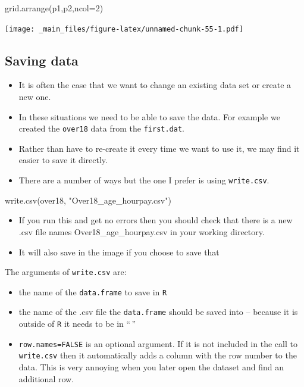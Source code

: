 \documentclass[
]{gitbook}
\newenvironment{Shaded}{\begin{snugshade}}{\end{snugshade}}
\newcommand{\AttributeTok}[1]{\textcolor[rgb]{0.77,0.63,0.00}{#1}}
\newcommand{\DecValTok}[1]{\textcolor[rgb]{0.00,0.00,0.81}{#1}}
\newcommand{\FunctionTok}[1]{\textcolor[rgb]{0.00,0.00,0.00}{#1}}
\newcommand{\NormalTok}[1]{#1}
\newcommand{\StringTok}[1]{\textcolor[rgb]{0.31,0.60,0.02}{#1}}
\providecommand{\tightlist}{%
  \setlength{\itemsep}{0pt}\setlength{\parskip}{0pt}}
\begin{document}
\begin{Shaded}
\begin{Highlighting}[]
\FunctionTok{grid.arrange}\NormalTok{(p1,p2,}\AttributeTok{ncol=}\DecValTok{2}\NormalTok{)}
\end{Highlighting}
\end{Shaded}

\texttt{[image: \_main\_files/figure-latex/unnamed-chunk-55-1.pdf]}

\hypertarget{saving-data}{%
\subsection{Saving data}\label{saving-data}}

\begin{itemize}
\tightlist
\item
  It is often the case that we want to change an existing data set or create a new one.
\item
  In these situations we need to be able to save the data. For example we created the \texttt{over18} data from the \texttt{first.dat}.
\item
  Rather than have to re-create it every time we want to use it, we may find it easier to save it directly.
\item
  There are a number of ways but the one I prefer is using \texttt{write.csv}.
\end{itemize}

\begin{Shaded}
\begin{Highlighting}[]
\FunctionTok{write.csv}\NormalTok{(over18, }\StringTok{"Over18\_age\_hourpay.csv"}\NormalTok{)}
\end{Highlighting}
\end{Shaded}

\begin{itemize}
\tightlist
\item
  If you run this and get no errors then you should check that there is a new .csv file names Over18\_age\_hourpay.csv in your working directory.
\item
  It will also save in the image if you choose to save that
\end{itemize}

The arguments of \texttt{write.csv} are:

\begin{itemize}
\tightlist
\item
  the name of the \texttt{data.frame} to save in \texttt{R}
\item
  the name of the .csv file the \texttt{data.frame} should be saved into -- because it is outside of \texttt{R} it needs to be in ``\,''
\item
  \texttt{row.names=FALSE} is an optional argument. If it is not included in the call to \texttt{write.csv} then it automatically adds a column with the row number to the data. This is very annoying when you later open the dataset and find an additional row.
\end{itemize}
\end{document}
